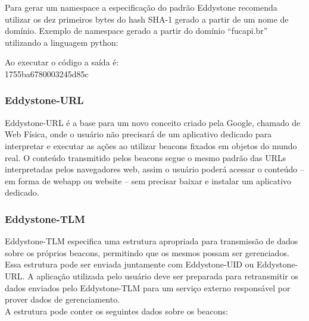 Para gerar um namespace a especificação do padrão Eddystone recomenda utilizar os dez primeiros bytes do hash SHA-1 gerado a partir de um nome de domínio. Exemplo de namespace gerado a partir do domínio ``fucapi.br'' utilizando a linguagem python:

\begin{figure}[h!]
	\centering
\end{figure}

Ao executar o código a saída é:\\
\indent 1755ba6780003245d85c

\subsubsection{Eddystone-URL}
\label{sec:eddystone-url}

Eddystone-URL é a base para um novo conceito criado pela Google, chamado de Web Física, onde o usuário não precisará de um aplicativo dedicado para interpretar e executar as ações ao utilizar beacons fixados em objetos do mundo real. O conteúdo transmitido pelos beacons segue o mesmo padrão das URLs interpretadas pelos navegadores web, assim o usuário poderá acessar o conteúdo -- em forma de webapp ou website -- sem precisar baixar e instalar um aplicativo dedicado.

\subsubsection{Eddystone-TLM}
\label{sec:eddystone-tlm}

Eddystone-TLM especifica uma estrutura apropriada para transmissão de dados sobre os próprios beacons, permitindo que os mesmos possam ser gerenciados. Essa estrutura pode ser enviada juntamente com Eddystone-UID ou Eddystone-URL. A aplicação utilizada pelo usuário deve ser preparada para retransmitir os dados enviados pelo Eddystone-TLM para um serviço externo responsável por prover dados de gerenciamento. \\
\indent A estrutura pode conter os seguintes dados sobre os beacons:      

